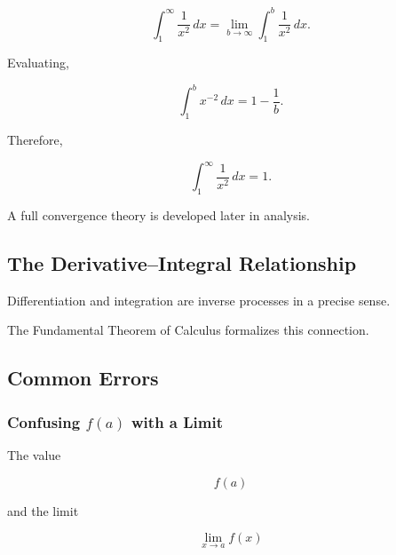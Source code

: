 \[ \int_1^\infty\frac1{x^2}\,dx
=
\lim_{b\to\infty}\int_1^b\frac1{x^2}\,dx. \]

Evaluating,

\[ \int_1^b x^{-2}\,dx
=
1-\frac1b. \]

Therefore,

\[ \boxed{\int_1^\infty\frac1{x^2}\,dx=1.} \]

A full convergence theory is developed later in analysis.

\subsection{The Derivative--Integral Relationship}
\label{subsec:derivative-integral-relationship}

Differentiation and integration are inverse processes in a precise sense.

\begin{center}
\end{center}

The Fundamental Theorem of Calculus formalizes this connection.

\subsection{Common Errors}
\label{subsec:single-variable-common-errors}

\subsubsection{Confusing \(f(a)\) with a Limit}

The value

\[ f(a) \]

and the limit

\[ \lim_{x\to a}f(x) \]

